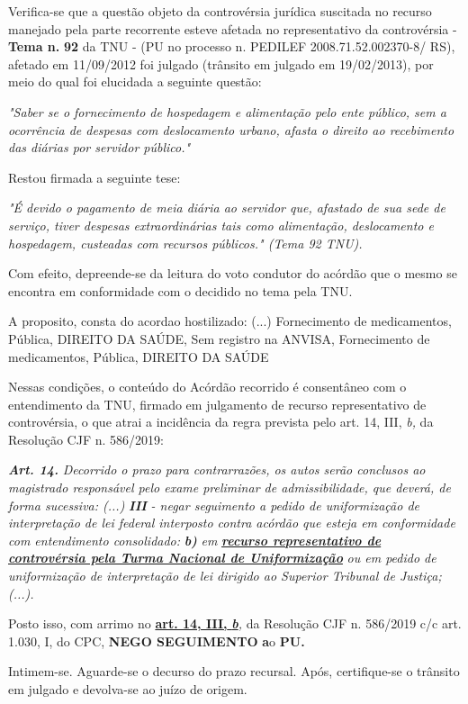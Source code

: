 \documentclass[12pt]{article}
\begin{document}
\justifying
\noindent Verifica-se que a questão objeto da controvérsia jurídica suscitada no recurso manejado pela parte recorrente esteve afetada no representativo da controvérsia - \textbf{Tema n. }\textbf{92} da TNU - (PU no processo n. PEDILEF 2008.71.52.002370-8/ RS),  afetado em 11/09/2012 foi julgado (trânsito em julgado em 19/02/2013), por meio do qual foi elucidada a seguinte questão:

\noindent \textit{"Saber se o fornecimento de hospedagem e alimentação pelo ente público, sem a ocorrência de despesas com deslocamento urbano, afasta o direito ao recebimento das diárias por servidor público."}

\noindent Restou firmada a seguinte tese:

\noindent \textit{"É devido o pagamento de meia diária ao servidor que, afastado de sua sede de serviço, tiver despesas extraordinárias tais como alimentação, deslocamento e hospedagem, custeadas com recursos públicos." (Tema 92 TNU).}

\noindent Com efeito, depreende-se da leitura do voto condutor do acórdão que o mesmo se encontra em conformidade com o decidido no  tema pela TNU.

\noindent A proposito, consta do acordao hostilizado: (...) Fornecimento de medicamentos, Pública, DIREITO DA SAÚDE, Sem registro na ANVISA, Fornecimento de medicamentos, Pública, DIREITO DA SAÚDE

\noindent Nessas condições, o conteúdo do Acórdão recorrido é consentâneo com o entendimento da TNU, firmado em julgamento de recurso representativo de controvérsia, o que atrai a incidência da regra prevista pelo art. 14, III, \textit{b,} da Resolução CJF n. 586/2019:

\noindent \textit{\textbf{Art. 14.}}\textit{ Decorrido o prazo para contrarrazões, os autos serão conclusos ao magistrado responsável pelo exame preliminar de admissibilidade, que deverá, de forma sucessiva: (...) }\textit{\textbf{III }}\textit{- negar seguimento a pedido de uniformização de interpretação de lei federal interposto contra acórdão que esteja em conformidade com entendimento consolidado: }\textit{\textbf{b)}}\textit{ em }\uline{\textit{\textbf{recurso representativo de controvérsia pela Turma Nacional de Uniformização}}}\textit{ ou em pedido de uniformização de interpretação de lei dirigido ao Superior Tribunal de Justiça;(...).}

\noindent Posto isso, com arrimo no \uline{\textbf{art. 14, III, }}\uline{\textit{\textbf{b}}}\textit{,} da Resolução CJF n. 586/2019 c/c art. 1.030, I, do CPC, \textbf{NEGO SEGUIMENTO }\textbf{a}o\textbf{ PU}\textbf{.}

\noindent Intimem-se. Aguarde-se o decurso do prazo recursal. Após, certifique-se o trânsito em julgado e devolva-se ao juízo de origem.
\end{document}
